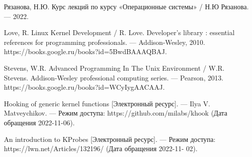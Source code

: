 
\begin{thebibliography}{9} 
    
    Рязанова, Н.Ю. Курс лекций по курсу «Операционные
    системы» / Н.Ю Рязанова. — 2022. \addtocounter{bibqty}{1}

    Love, R. Linux Kernel Development / R. Love. Developer’s library
    : essential references for programming professionals. — Addison-Wesley,
    2010. https://books.google.ru/books?id=5BwdBAAAQBAJ.    \addtocounter{bibqty}{1}

    Stevens, W.R. Advanced Programming In The Unix Environment /
    W.R. Stevens. Addison-Wesley professional computing series. — Pearson,
    2013. https://books.google.ru/books?id=WCyIygAACAAJ.    \addtocounter{bibqty}{1}
    
    Hooking of generic kernel functions [Электронный ресурс]. — Ilya
    V. Matveychikov. — Режим доступа: https://github.com/milabs/khook
    (Дата обращения 2022-11-06).    \addtocounter{bibqty}{1}

    An introduction to KProbes [Электронный ресурс]. — Режим
    доступа: https://lwn.net/Articles/132196/ (Дата обращения 2022-11-
    02).
    \addtocounter{bibqty}{1}

\end{thebibliography}
